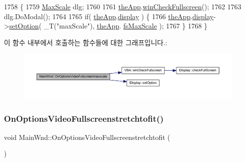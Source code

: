 \begin{DoxyCode}
1758 \{
1759   \mbox{\hyperlink{class_max_scale}{MaxScale}} dlg;
1760 
1761   \mbox{\hyperlink{_v_b_a_8cpp_a8095a9d06b37a7efe3723f3218ad8fb3}{theApp}}.\mbox{\hyperlink{class_v_b_a_a340eaeeb7fcfc242f08ac3442d991a96}{winCheckFullscreen}}();
1762 
1763   dlg.DoModal();
1764 
1765   \textcolor{keywordflow}{if}( \mbox{\hyperlink{_v_b_a_8cpp_a8095a9d06b37a7efe3723f3218ad8fb3}{theApp}}.\mbox{\hyperlink{class_v_b_a_a940e5bad8b3ed2436888dbcd03bfd563}{display}} ) \{
1766       \mbox{\hyperlink{_v_b_a_8cpp_a8095a9d06b37a7efe3723f3218ad8fb3}{theApp}}.\mbox{\hyperlink{class_v_b_a_a940e5bad8b3ed2436888dbcd03bfd563}{display}}->\mbox{\hyperlink{class_i_display_a1766244708c252bb8781892c76c20ba9}{setOption}}( \_T(\textcolor{stringliteral}{"maxScale"}), \mbox{\hyperlink{_v_b_a_8cpp_a8095a9d06b37a7efe3723f3218ad8fb3}{theApp}}.
      \mbox{\hyperlink{class_v_b_a_a1a4cfe79496ea8a029bc591f33c489d6}{fsMaxScale}} );
1767   \}
1768 \}
\end{DoxyCode}
이 함수 내부에서 호출하는 함수들에 대한 그래프입니다.\+:
\nopagebreak
\begin{figure}[H]
\begin{center}
\leavevmode
\includegraphics[width=350pt]{class_main_wnd_a31678f98dfdc982e2f4e242293fc85e0_cgraph}
\end{center}
\end{figure}
\mbox{\label{class_main_wnd_a261e810d4a9386c968d30a3449389f54}} 
\subsubsection{\texorpdfstring{On\+Options\+Video\+Fullscreenstretchtofit()}{OnOptionsVideoFullscreenstretchtofit()}}
{\footnotesize\ttfamily void Main\+Wnd\+::\+On\+Options\+Video\+Fullscreenstretchtofit (\begin{DoxyParamCaption}{ }\end{DoxyParamCaption})\hspace{0.3cm}{\ttfamily [protected]}}



